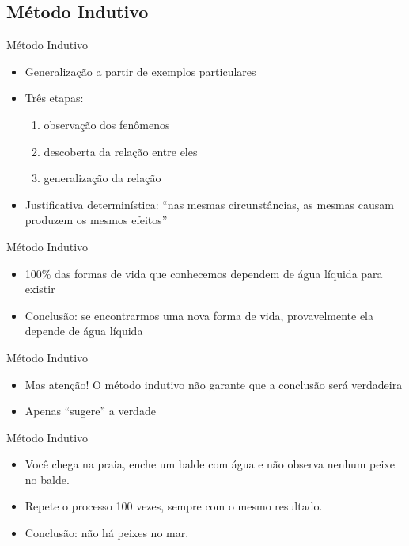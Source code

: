\documentclass{beamer}
\begin{document}
\subsection{Método Indutivo}

\begin{frame}{Método Indutivo}
  \begin{itemize}
  \item \alert<1>{Generalização} a partir de exemplos particulares
  \item Três etapas:
    \begin{enumerate}
    \item observação dos fenômenos
    \item descoberta da relação entre eles
    \item generalização da relação
    \end{enumerate}
  \item Justificativa determinística: ``nas mesmas circunstâncias, as
    mesmas causam produzem os mesmos efeitos''
  \end{itemize}
\end{frame}

\begin{frame}{Método Indutivo}
  \begin{example}
    \begin{itemize}
    \item 100\% das formas de vida que conhecemos dependem de água
      líquida para existir
    \item Conclusão: se encontrarmos uma nova forma de vida,
      \alert{provavelmente} ela depende de água líquida
    \end{itemize}
  \end{example}
\end{frame}

\begin{frame}{Método Indutivo}
  \begin{itemize}
  \item Mas atenção! O método indutivo não garante que a conclusão
    será verdadeira
  \item Apenas ``sugere'' a verdade
  \end{itemize}
\end{frame}

\begin{frame}{Método Indutivo}
  \begin{example}
    \begin{itemize}
    \item Você chega na praia, enche um balde com água e não observa
      nenhum peixe no balde.
    \item Repete o processo 100 vezes, sempre com o mesmo resultado.
    \item Conclusão: não há peixes no mar.
    \end{itemize}
  \end{example}
\end{frame}
\end{document}
